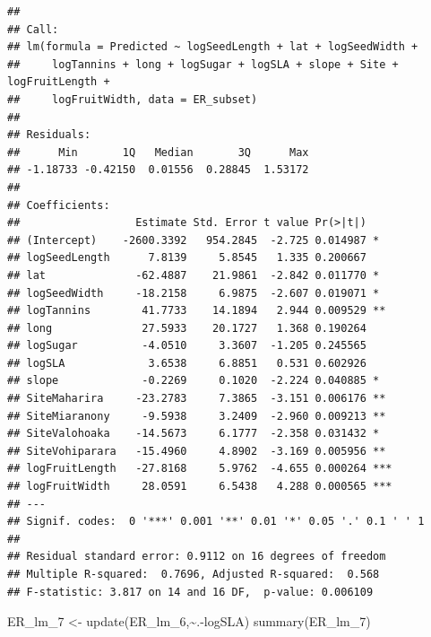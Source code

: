 \documentclass[
  12pt,
]{article}
\newenvironment{Shaded}{\begin{snugshade}}{\end{snugshade}}
\newcommand{\FunctionTok}[1]{\textcolor[rgb]{0.00,0.00,0.00}{#1}}
\newcommand{\NormalTok}[1]{#1}
\newcommand{\OtherTok}[1]{\textcolor[rgb]{0.56,0.35,0.01}{#1}}
\newcommand{\SpecialCharTok}[1]{\textcolor[rgb]{0.00,0.00,0.00}{#1}}
\begin{document}
\begin{verbatim}
## 
## Call:
## lm(formula = Predicted ~ logSeedLength + lat + logSeedWidth + 
##     logTannins + long + logSugar + logSLA + slope + Site + logFruitLength + 
##     logFruitWidth, data = ER_subset)
## 
## Residuals:
##      Min       1Q   Median       3Q      Max 
## -1.18733 -0.42150  0.01556  0.28845  1.53172 
## 
## Coefficients:
##                  Estimate Std. Error t value Pr(>|t|)    
## (Intercept)    -2600.3392   954.2845  -2.725 0.014987 *  
## logSeedLength      7.8139     5.8545   1.335 0.200667    
## lat              -62.4887    21.9861  -2.842 0.011770 *  
## logSeedWidth     -18.2158     6.9875  -2.607 0.019071 *  
## logTannins        41.7733    14.1894   2.944 0.009529 ** 
## long              27.5933    20.1727   1.368 0.190264    
## logSugar          -4.0510     3.3607  -1.205 0.245565    
## logSLA             3.6538     6.8851   0.531 0.602926    
## slope             -0.2269     0.1020  -2.224 0.040885 *  
## SiteMaharira     -23.2783     7.3865  -3.151 0.006176 ** 
## SiteMiaranony     -9.5938     3.2409  -2.960 0.009213 ** 
## SiteValohoaka    -14.5673     6.1777  -2.358 0.031432 *  
## SiteVohiparara   -15.4960     4.8902  -3.169 0.005956 ** 
## logFruitLength   -27.8168     5.9762  -4.655 0.000264 ***
## logFruitWidth     28.0591     6.5438   4.288 0.000565 ***
## ---
## Signif. codes:  0 '***' 0.001 '**' 0.01 '*' 0.05 '.' 0.1 ' ' 1
## 
## Residual standard error: 0.9112 on 16 degrees of freedom
## Multiple R-squared:  0.7696, Adjusted R-squared:  0.568 
## F-statistic: 3.817 on 14 and 16 DF,  p-value: 0.006109
\end{verbatim}

\begin{Shaded}
\begin{Highlighting}[]
\NormalTok{ER\_lm\_7 }\OtherTok{\textless{}{-}} \FunctionTok{update}\NormalTok{(ER\_lm\_6,}\SpecialCharTok{\textasciitilde{}}\NormalTok{.}\SpecialCharTok{{-}}\NormalTok{logSLA)}
\FunctionTok{summary}\NormalTok{(ER\_lm\_7)}
\end{Highlighting}
\end{Shaded}
\end{document}
